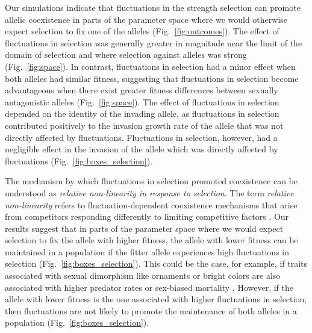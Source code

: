 \documentclass[12pt]{article}
\begin{document}
Our simulations indicate that fluctuations in the strength selection can promote allelic coexistence in parts of the parameter space where we would otherwise expect selection to fix one of the alleles (Fig.~\ref{fig:outcomes}). The effect of fluctuations in selection was generally greater in magnitude near the limit of the domain of selection and where selection against alleles was strong (Fig.~\ref{fig:space}). In contrast, fluctuations in selection had a minor effect when both alleles had similar fitness, suggesting that fluctuations in selection become advantageous when there exist greater fitness differences between sexually antagonistic alleles (Fig.~\ref{fig:space}). The effect of fluctuations in selection depended on the identity of the invading allele, as fluctuations in selection contributed positively to the invasion growth rate of the allele that was not directly affected by fluctuations. Fluctuations in selection, however, had a negligible effect in the invasion of the allele which was directly affected by fluctuations (Fig.~\ref{fig:boxes_selection}).

 The mechanism by which fluctuations in selection promoted coexistence can be understood as \textit{relative non-linearity in response to selection}. The term \textit{relative non-linearity} refers to fluctuation-dependent coexistence mechanisms that arise from competitors responding differently to limiting competitive factors \citep{chesson2000general,ellner2016quantify,zepeda2019fluctuation}. Our results suggest that in parts of the parameter space where we would expect selection to fix the allele with higher fitness, the allele with lower fitness can be maintained in a population if the fitter allele experiences high fluctuations in selection (Fig.~\ref{fig:boxes_selection}). This could be the case, for example, if traits associated with sexual dimorphism like ornaments or bright colors are also associated with higher predator rates \citep{bildstein1989consequences,gotmark1997natural} or sex-biased mortality \citep{promislow1992mortality}. However, if the allele with lower fitness is the one associated with higher fluctuations in selection, then fluctuations are not likely to promote the maintenance of both alleles in a population (Fig.~\ref{fig:boxes_selection}).
\end{document}
